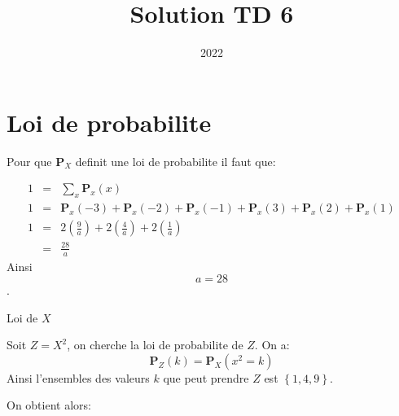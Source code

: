\documentclass[a4paper]{tufte-handout}
\title{Solution TD 6}
\date{2022}
\begin{document}
\maketitle

\renewcommand{\P}{\mathbf{P}}

\section{Loi de probabilite}

Pour que $\P_X$ definit une loi de probabilite il faut que:

\begin{eqnarray*}
1& = & \sum_x \P_x(x) \\
1 & = & \P_x(-3) + \P_x(-2) + \P_x(-1) + \P_x(3) + \P_x(2) + \P_x(1)\\
               1 & = & 2\left(\frac{9}{a}\right) + 2\left(\frac{4}{a}\right) +
               2\left(\frac{1}{a}\right)\\
                 & = & \frac{28}{a}
\end{eqnarray*}
Ainsi 
$$
a = 28
$$.
\begin{marginfigure}
\begin{center}
\end{center}
\caption{Loi de $X$}%
\end{marginfigure}

Soit $Z = X^2$, on cherche la loi de probabilite de $Z$.
  On a:
  \begin{equation*}
    \P_Z(k) = \P_X(x^2 = k)
  \end{equation*}
  Ainsi l'ensembles des valeurs $k$ que peut prendre $Z$ est $\left\{1, 4,
  9\right\}.$

  On obtient alors:
\end{document}

